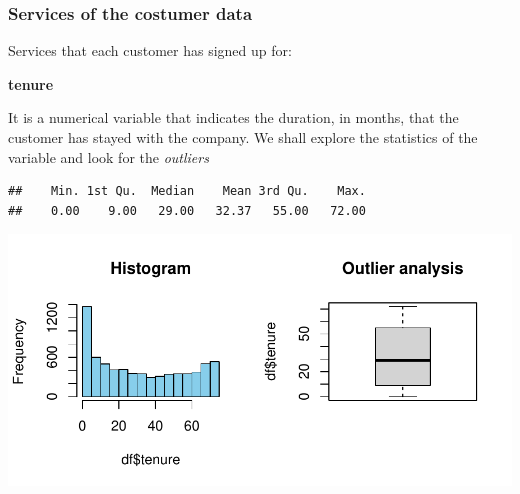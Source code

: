 \documentclass[
  twoside]{article}
\newenvironment{Shaded}{\begin{snugshade}}{\end{snugshade}}
\newcommand{\AttributeTok}[1]{\textcolor[rgb]{0.13,0.29,0.53}{#1}}
\newcommand{\CommentTok}[1]{\textcolor[rgb]{0.56,0.35,0.01}{\textit{#1}}}
\newcommand{\DecValTok}[1]{\textcolor[rgb]{0.00,0.00,0.81}{#1}}
\newcommand{\FloatTok}[1]{\textcolor[rgb]{0.00,0.00,0.81}{#1}}
\newcommand{\FunctionTok}[1]{\textcolor[rgb]{0.13,0.29,0.53}{\textbf{#1}}}
\newcommand{\NormalTok}[1]{#1}
\newcommand{\OtherTok}[1]{\textcolor[rgb]{0.56,0.35,0.01}{#1}}
\newcommand{\SpecialCharTok}[1]{\textcolor[rgb]{0.81,0.36,0.00}{\textbf{#1}}}
\newcommand{\StringTok}[1]{\textcolor[rgb]{0.31,0.60,0.02}{#1}}
\begin{document}
\hypertarget{services-of-the-costumer-data}{%
\subsubsection{\texorpdfstring{\textbf{Services of the costumer
data}}{Services of the costumer data}}\label{services-of-the-costumer-data}}

Services that each customer has signed up for:

\textbf{tenure}

It is a numerical variable that indicates the duration, in months, that
the customer has stayed with the company. We shall explore the
statistics of the variable and look for the \emph{outliers}

\begin{verbatim}
##    Min. 1st Qu.  Median    Mean 3rd Qu.    Max. 
##    0.00    9.00   29.00   32.37   55.00   72.00
\end{verbatim}

\includegraphics{Assigment2_files/figure-latex/unnamed-chunk-9-1.pdf}

\begin{Shaded}
\end{Shaded}
\end{document}
